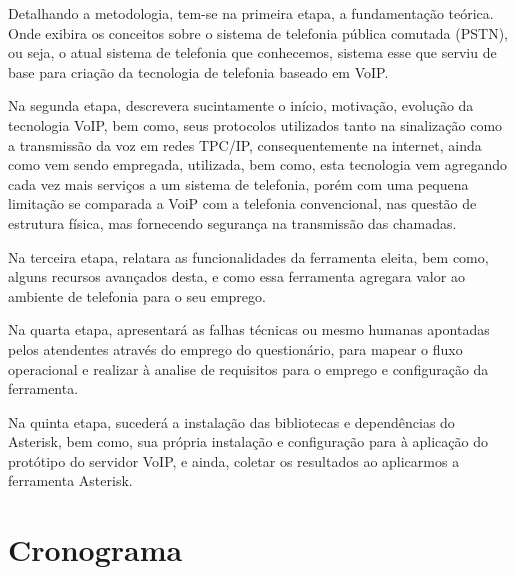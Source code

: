 Detalhando a metodologia, tem-se na primeira etapa, a fundamentação teórica. Onde exibira os conceitos sobre o sistema de telefonia pública comutada (PSTN), ou seja, o atual sistema de telefonia que conhecemos, sistema esse que serviu de base para criação da tecnologia de telefonia baseado em VoIP.

	Na segunda etapa, descrevera sucintamente o início, motivação, evolução da tecnologia VoIP, bem como, seus protocolos utilizados tanto na sinalização como a transmissão da voz em redes TPC/IP, consequentemente na internet, ainda como vem sendo empregada, utilizada, bem como, esta tecnologia vem agregando cada vez mais serviços a um sistema de telefonia, porém com uma pequena limitação se comparada a VoiP com a telefonia convencional, nas questão de estrutura física, mas fornecendo segurança na transmissão das chamadas.

	Na  terceira etapa, relatara as funcionalidades da ferramenta eleita, bem como, alguns recursos avançados desta, e como essa ferramenta agregara valor ao ambiente de telefonia para o seu emprego.

	Na quarta etapa, apresentará as falhas técnicas ou mesmo humanas apontadas pelos atendentes através do emprego do questionário, para mapear o fluxo operacional e realizar à analise de requisitos para o emprego e configuração da ferramenta.

	Na quinta etapa, sucederá a instalação das bibliotecas e dependências do Asterisk, bem como, sua própria instalação e configuração para à aplicação do protótipo do servidor VoIP, e ainda, coletar os resultados ao aplicarmos a ferramenta Asterisk.


\newpage
\section{Cronograma}
\thispagestyle{empty}

